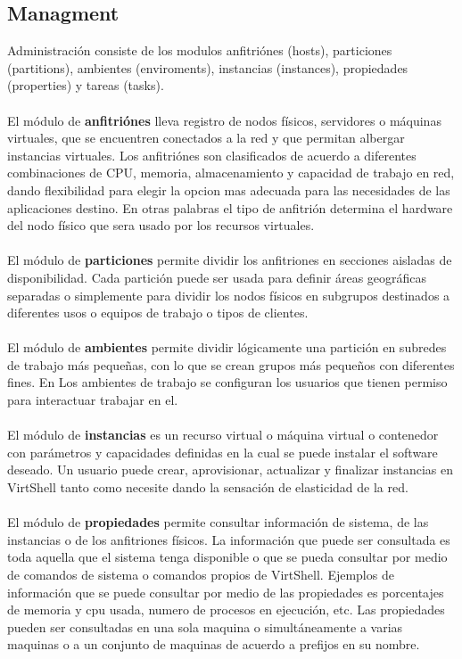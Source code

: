 \subsection{Managment}
Administración consiste de los modulos anfitriónes (hosts), particiones (partitions), ambientes (enviroments), instancias (instances), propiedades (properties) y tareas (tasks). \\
\\
El módulo de \textbf{anfitriónes} lleva registro de nodos físicos, servidores o máquinas virtuales, que se encuentren conectados a la red y que permitan albergar instancias virtuales. Los anfitriónes son clasificados de acuerdo a diferentes combinaciones de CPU, memoria, almacenamiento y capacidad de trabajo en red, dando flexibilidad para elegir la opcion mas adecuada para las necesidades de las aplicaciones destino. En otras palabras el tipo de anfitrión determina el hardware del nodo físico que sera usado por los recursos virtuales.\\
\\
El módulo de \textbf{particiones} permite dividir los anfitriones en secciones aisladas de disponibilidad. Cada partición puede ser usada para definir áreas geográficas separadas o simplemente para dividir los nodos físicos en subgrupos destinados a diferentes usos o equipos de trabajo o tipos de clientes.\\
\\
El módulo de \textbf{ambientes} permite dividir lógicamente una partición en subredes de trabajo más pequeñas, con lo que se crean grupos más pequeños con diferentes fines. En Los ambientes de trabajo se configuran los usuarios que tienen permiso para interactuar trabajar en el.\\
\\
El módulo de \textbf{instancias} es un recurso virtual o máquina virtual o contenedor con parámetros y capacidades definidas en la cual se puede instalar el software deseado. Un usuario puede crear, aprovisionar, actualizar y finalizar instancias en VirtShell tanto como necesite dando la sensación de elasticidad de la red.\\
\\
El módulo de \textbf{propiedades} permite consultar información de sistema, de las instancias o de los anfitriones físicos. La información que puede ser consultada es toda aquella que el sistema tenga disponible o que se pueda consultar por medio de comandos de sistema o comandos propios de VirtShell. Ejemplos de información que se puede consultar por medio de las propiedades es porcentajes de memoria y cpu usada, numero de procesos en ejecución, etc. Las propiedades pueden ser consultadas en una sola maquina o simultáneamente a varias maquinas o a un conjunto de maquinas de acuerdo a prefijos en su nombre.\\
